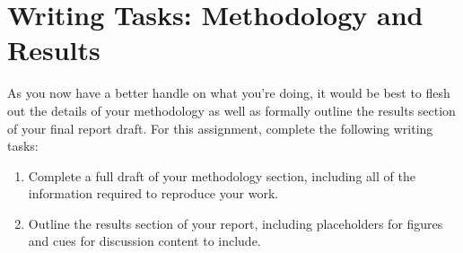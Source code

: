 \documentclass[11pt]{article}
\begin{document}
\section{Writing Tasks: Methodology and Results}

As you now have a better handle on what you're doing, it would be best to flesh out the details of your methodology as well as formally outline the results section of your final report draft.
For this assignment, complete the following writing tasks:

\begin{enumerate}[label=\alph*.]
	\item Complete a full draft of your methodology section, including all of the information required to reproduce your work.  
	\item Outline the results section of your report, including placeholders for figures and cues for discussion content to include.
\end{enumerate}
	
	
\end{document}
